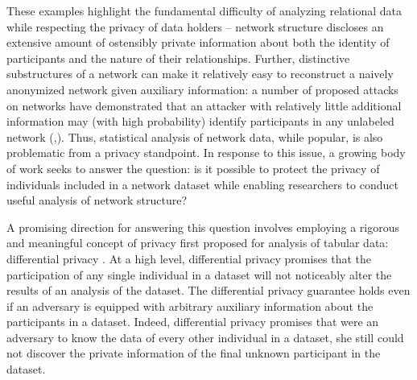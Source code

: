 
These examples highlight the fundamental difficulty of analyzing relational data while respecting the privacy of data holders -- network structure discloses an extensive amount of ostensibly private information about both the identity of participants and the nature of their relationships. Further, distinctive substructures of a network can make it relatively easy to reconstruct a naively anonymized network given auxiliary information: a number of proposed attacks on networks have demonstrated that an attacker with relatively little additional information may (with high probability) identify participants in any unlabeled network (\cite{BDK11},\cite{NS09}). Thus, statistical analysis of network data, while popular, is also problematic from a privacy standpoint. In response to this issue, a growing body of work seeks to answer the question: is it possible to protect the privacy of individuals included in a network dataset while enabling researchers to conduct useful analysis of network structure?

A promising direction for answering this question involves employing a rigorous and meaningful concept of privacy first proposed for analysis of tabular data: differential privacy \cite{DMNS06}. At a high level, differential privacy promises that the participation of any single individual in a dataset will not noticeably alter the results of an analysis of the dataset. The differential privacy guarantee  holds even if an adversary is equipped with arbitrary auxiliary information about the participants in a dataset. Indeed, differential privacy promises that were an adversary to know the data of every other individual in a dataset, she still could not discover the private information of the final unknown participant in the dataset. 


